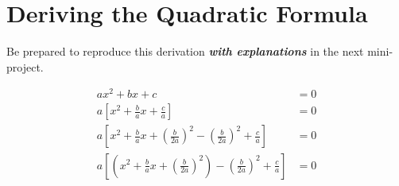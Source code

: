 \section{Deriving the Quadratic Formula}

Be prepared to reproduce this derivation 
{\bfseries\itshape with explanations} in the next mini-project.

\begin{minipage}{0.75\textwidth}
    {
        \large
        \begin{align*}
            a x^2 + bx + c &= 0 
            \\[1.5em]
            a \left[ 
                x^2 + \frac{b}{a}x + \frac{c}{a} 
            \right] &= 0 
            \\[1.5em]
            a \left[ 
                x^2 + \frac{b}{a}x    
                + \left( \frac{b}{2a} \right)^2 
                - \left( \frac{b}{2a} \right)^2 
                +     \frac{c}{a} 
            \right] &= 0 
            \\[1em]
            a \left[ 
                \left(
                    x^2 
                    + \frac{b}{a}x    
                    + \left( \frac{b}{2a} \right)^2 
                \right)
                - \left( \frac{b}{2a} \right)^2 
                +     \frac{c}{a} 
            \right] &= 0 
        \end{align*}
    }
\end{minipage}

